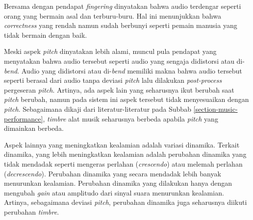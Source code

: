 Bersama dengan pendapat \textit{fingering} dinyatakan bahwa audio terdengar seperti orang yang bermain asal dan terburu-buru. Hal ini menunjukkan bahwa \textit{correctness} yang rendah namun sudah berbunyi seperti pemain manusia yang tidak bermain dengan baik.

Meski aspek \textit{pitch} dinyatakan lebih alami, muncul pula pendapat yang menyatakan bahwa audio tersebut seperti audio yang sengaja didistorsi atau di-\textit{bend}. Audio yang didistorsi atau di-\textit{bend} memiliki makna bahwa audio tersebut seperti berasal dari audio tanpa deviasi \textit{pitch} lalu dilakukan \textit{post-process} pergeseran \textit{pitch}. Artinya, ada aspek lain yang seharusnya ikut berubah saat \textit{pitch} berubah, namun pada sistem ini aspek tersebut tidak menyesuaikan dengan \textit{pitch}. Sebagaimana dikaji dari literatur-literatur pada Subbab \ref{section-music-performance}, \textit{timbre} alat musik seharusnya berbeda apabila \textit{pitch} yang dimainkan berbeda.

Aspek lainnya yang meningkatkan kealamian adalah variasi dinamika. Terkait dinamika, yang lebih meningkatkan kealamian adalah perubahan dinamika yang tidak mendadak seperti mengeras perlahan (\textit{crescendo}) atau melemah perlahan (\textit{decrescendo}). Perubahan dinamika yang secara mendadak lebih banyak menurunkan kealamian. Perubahan dinamika yang dilakukan hanya dengan mengubah \textit{gain} atau amplitudo dari sinyal suara menurunkan kealamian. Artinya, sebagaimana deviasi \textit{pitch}, perubahan dinamika juga seharusnya diikuti perubahan \textit{timbre}.

